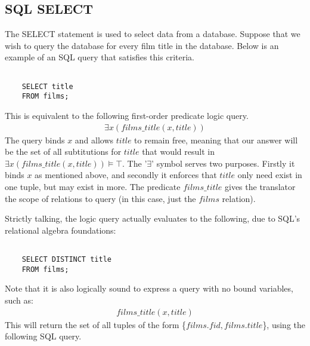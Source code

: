 \documentclass[a4paper, 11pt]{article}
\begin{document}
    \subsection{SQL SELECT}

    The SELECT statement is used to select data from a database.\cite{w3SELECT}
    Suppose that we wish to query the database for every film title in the
    database. Below is an example of an SQL query that satisfies this criteria.

    \begin{verbatim}

    SELECT title
    FROM films;

    \end{verbatim}

    This is equivalent to the following first-order predicate logic query.
    \begin{gather}
      \exists x(films\_title(x, title)) \label{select1}
    \end{gather}
    The query binds $x$ and allows $title$ to remain free, meaning that our
    answer will be the set of all subtitutions for $title$ that would result in
    $\exists x(films\_title(x, title)) \models \top$. The '$\exists$' symbol
    serves two purposes. Firstly it binds $x$ as mentioned above, and secondly
    it enforces that $title$ only need exist in one tuple, but may exist in
    more. The predicate $films\_title$ gives the translator the scope of
    relations to query (in this case, just the $films$ relation).

    Strictly talking, the logic query actually evaluates to the following, due
    to SQL's relational algebra foundations:


    \begin{verbatim}

    SELECT DISTINCT title
    FROM films;

    \end{verbatim}


    Note that it is also logically sound to express a query with no bound
    variables, such as:
    \begin{gather}
      films\_title(x, title) \label{select2}
    \end{gather}
    This will return the set of all tuples of the form \{$films.fid,
    films.title$\}, using the following SQL query.
\end{document}
